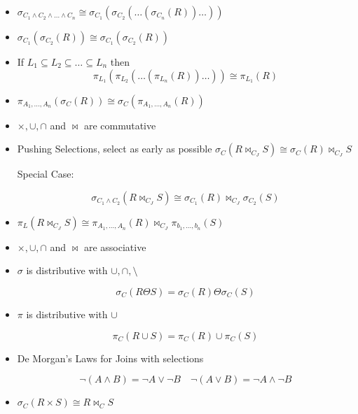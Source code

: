 \begin{itemize}
    
    \item \(\sigma_{C_1 \land C_2 \land \dots \land C_n} \cong \sigma_{C_1} ( \sigma_{C_2} ( \dots ( \sigma_{C_n} (R)) \dots ))\)
    
    \item \(\sigma_{C_1} (\sigma_{C_2} (R)) \cong \sigma_{C_1} (\sigma_{C_2} (R))\)
    
    \item If \(L_1 \subseteq L_2 \subseteq \dots \subseteq L_n\) then 
        \[
            \pi_{L_1} (\pi_{L_2} ( \dots ( \pi_{L_n} (R)) \dots ) ) \cong \pi_{L_1} (R) 
        \]
    
    \item \(\pi_{A_1, \dots, A_n} (\sigma_{C} (R)) \cong \sigma_C ( \pi_{A_1, \dots, A_n}(R))\)
    
    \item \(\times, \cup, \cap\) and \(\bowtie\) are commutative
    
    \item Pushing Selections, select as early as possible \( \sigma_C \left(R \bowtie_{C_J} S \right) \cong \sigma_C (R) \bowtie_{C_J} S\)

    Special Case: 

    \[
     \sigma_{C_1 \land C_2} \left(R \bowtie_{C_J} S \right) \cong \sigma_{C_1} (R) \bowtie_{C_J} \sigma_{C_2} (S)
    \]

    \item \(\pi_L (R \bowtie_{C_J} S) \cong \pi_{A_1, \dots, A_n}(R) \bowtie_{C_J} \pi_{b_1, \dots, b_n}(S)\)
    
    \item \(\times, \cup, \cap\) and \(\bowtie\) are associative
   
    \item \(\sigma\) is distributive with \(\cup, \cap, \setminus\) 

    \[
        \sigma_C (R \Theta S) = \sigma_C (R) \Theta \sigma_C (S)
    \]
    
    \item \(\pi\) is distributive with \(\cup\) 

    \[
        \pi_C (R \cup S) = \pi_C (R) \cup \pi_C (S)
    \]
    
    \item De Morgan’s Laws for Joins with selections 

    \[
        \neg (A \land B) = \neg A \lor \neg B \quad \neg (A \lor B) = \neg A \land \neg B
    \]
    
    \item \(\sigma_C (R \times S) \cong R \bowtie_C S\)

\end{itemize}
